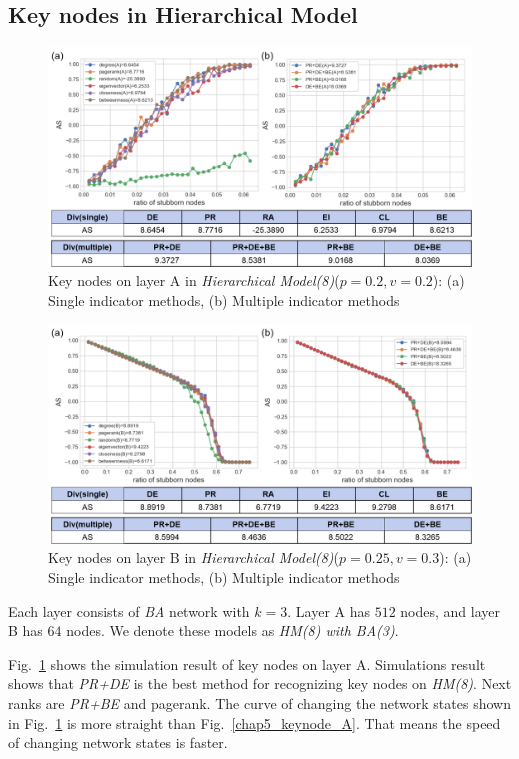 \subsection{Key nodes in Hierarchical Model}
\begin{figure}[!htb]
	\centering
	\includegraphics[width=\hsize]{figure/chap5_keynode_HM_A.png}
	\caption{Key nodes on layer A in \textit{Hierarchical Model(8)}($p=0.2, v=0.2$):
		(a) Single indicator methods, (b) Multiple indicator methods}
	\label{chap5_keynode_HM_A}
\end{figure}
\begin{figure}[!htb]
	\centering
	\includegraphics[width=\hsize]{figure/chap5_keynode_HM_B.png}
	\caption{Key nodes on layer B in \textit{Hierarchical Model(8)}($p=0.25, v=0.3$):
		(a) Single indicator methods, (b) Multiple indicator methods}
	\label{chap5_keynode_HM_B}
\end{figure}

Each layer consists of \textit{BA} network with $k=3$. Layer A has $512$ nodes, and layer B has $64$ nodes. We denote these models as \textit{HM(8) with BA(3)}.

Fig.~\ref{chap5_keynode_HM_A} shows the simulation result of key nodes on layer A. Simulations result shows that \textit{PR+DE} is the best method for recognizing key nodes on \textit{HM(8)}. Next ranks are \textit{PR+BE} and pagerank. The curve of changing the network states shown in Fig.~\ref{chap5_keynode_HM_A} is more straight than Fig.~\ref{chap5_keynode_A}. That means the speed of changing network states is faster. 

